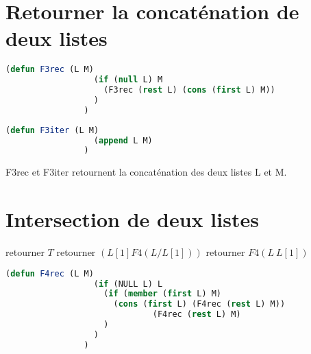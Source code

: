 \documentclass[a4paper, 12pt, leqno]{report}
\theoremstyle{plain}
\begin{document}
            
        \section{Retourner la concaténation de deux listes}
                    
            \begin{lstlisting}[label=some-code,caption=F3 (L M) version recursive,language=lisp]
                (defun F3rec (L M)
                  (if (null L) M
                    (F3rec (rest L) (cons (first L) M))
                  )
                )
            \end{lstlisting}
          
            \begin{lstlisting}[label=some-code,caption=F3 (L M) version itérative,language=lisp]
                (defun F3iter (L M)
                  (append L M)
                )
            \end{lstlisting}       
F3rec et F3iter retournent la concaténation des deux listes L et M.


        \newpage
        
        \section{Intersection de deux listes}
            \begin{algorithm}
            \caption{Algorithme pour l'intersection de deux listes}
            \begin{algorithmic}
                \State retourner $T$
                     \State retourner $(L[1] F4(L / L[1]))$
            \Else                   
                    \State retourner $F4(L \ L[1])$
            \EndIf        
            \end{algorithmic}
            \end{algorithm}
            
            
            \begin{lstlisting}[label=some-code,caption=F4 (L M) version recursive,language=lisp]
                (defun F4rec (L M)
	              (if (NULL L) L
		            (if (member (first L) M) 
		              (cons (first L) (F4rec (rest L) M)) 
                              (F4rec (rest L) M)
		            )	
	              )
                ) 
            \end{lstlisting}
          
\end{document}
